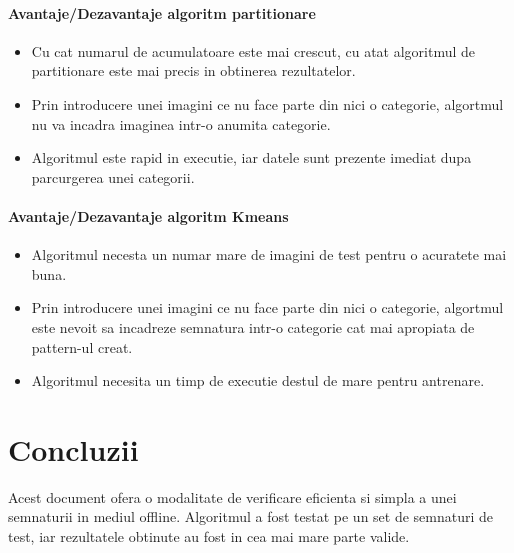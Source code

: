 \documentclass[conference]{IEEEtran}
\begin{document}
\paragraph{Avantaje/Dezavantaje algoritm partitionare}
\begin{itemize}
	\item Cu cat numarul de acumulatoare este mai crescut, cu atat algoritmul de partitionare este mai precis in obtinerea rezultatelor.
	\item Prin introducere unei imagini ce nu face parte din nici o categorie, algortmul nu va incadra imaginea intr-o anumita categorie.
	\item Algoritmul este rapid in executie, iar datele sunt prezente imediat dupa parcurgerea unei categorii.
\end{itemize}

\paragraph{Avantaje/Dezavantaje algoritm Kmeans}
\begin{itemize}
	\item Algoritmul necesta un numar mare de imagini de test pentru o acuratete mai buna.
	\item Prin introducere unei imagini ce nu face parte din nici o categorie, algortmul este nevoit sa incadreze semnatura intr-o categorie cat mai apropiata de pattern-ul creat.
	\item Algoritmul necesita un timp de executie destul de mare pentru antrenare.
\end{itemize}


\section{Concluzii}
Acest document ofera o modalitate de verificare eficienta si simpla a unei semnaturii in mediul offline. Algoritmul a fost testat pe un set de semnaturi de test, iar rezultatele obtinute au fost in cea mai mare parte valide.
\end{document}
